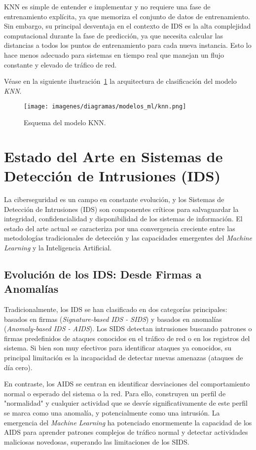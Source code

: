 KNN es simple de entender e implementar y no requiere una fase de entrenamiento explícita, ya que memoriza el conjunto de datos de entrenamiento. Sin embargo, su principal desventaja en el contexto de IDS es la alta complejidad computacional durante la fase de predicción, ya que necesita calcular las distancias a todos los puntos de entrenamiento para cada nueva instancia. Esto lo hace menos adecuado para sistemas en tiempo real que manejan un flujo constante y elevado de tráfico de red.

Véase en la siguiente ilustración~\ref{Fig.knn} la arquitectura de clasificación del modelo \textit{KNN}.

\begin{figure}[ht!]
  \centering
  \texttt{[image: imagenes/diagramas/modelos\_ml/knn.png]}
  \caption{Esquema del modelo KNN.}
  \label{Fig.knn}
\end{figure}

\section{Estado del Arte en Sistemas de Detección de Intrusiones (IDS)}

La ciberseguridad es un campo en constante evolución, y los Sistemas de Detección de Intrusiones (IDS) son componentes críticos para salvaguardar la integridad, confidencialidad y disponibilidad de los sistemas de información. El estado del arte actual se caracteriza por una convergencia creciente entre las metodologías tradicionales de detección y las capacidades emergentes del \textit{Machine Learning} y la Inteligencia Artificial.

\subsection{Evolución de los IDS: Desde Firmas a Anomalías}
Tradicionalmente, los IDS se han clasificado en dos categorías principales: basados en firmas (\textit{Signature-based IDS - SIDS}) y basados en anomalías (\textit{Anomaly-based IDS - AIDS}). Los SIDS detectan intrusiones buscando patrones o firmas predefinidos de ataques conocidos en el tráfico de red o en los registros del sistema. Si bien son muy efectivos para identificar ataques ya conocidos, su principal limitación es la incapacidad de detectar nuevas amenazas (ataques de día cero).

En contraste, los AIDS se centran en identificar desviaciones del comportamiento normal o esperado del sistema o la red. Para ello, construyen un perfil de "normalidad" y cualquier actividad que se desvíe significativamente de este perfil se marca como una anomalía, y potencialmente como una intrusión. La emergencia del \textit{Machine Learning} ha potenciado enormemente la capacidad de los AIDS para aprender patrones complejos de tráfico normal y detectar actividades maliciosas novedosas, superando las limitaciones de los SIDS.

